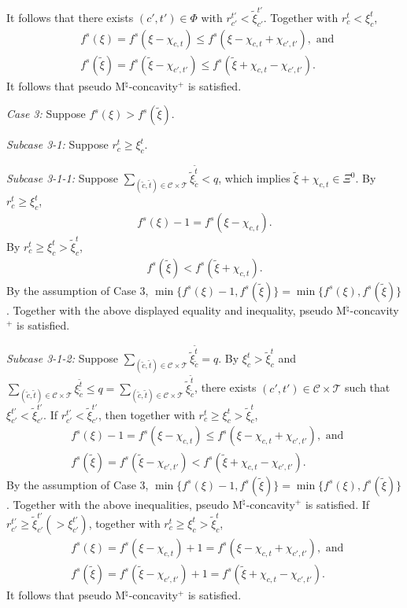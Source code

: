 \documentclass[12pt]{amsart}
\newcommand{\corigin}{c'}
\theoremstyle{remark}
\begin{document}
It follows that there exists $(\corigin,t')\in \Phi$ with $r_{\corigin}^{t'}<\tilde \xi_{\corigin}^{t'}$.
Together with $r_c^t<\xi_c^t$,
\begin{align*}
&f^s(\xi)=f^s(\xi-\chi_{c,t})\leq f^s(\xi-\chi_{c,t}+\chi_{\corigin,t'}), \text{ and } \\
&f^s(\tilde \xi)=f^s(\tilde \xi-\chi_{\corigin,t'})\leq f^s(\tilde \xi+\chi_{c,t}-\chi_{\corigin,t'}).
\end{align*}
It follows that pseudo M$^\natural$-concavity$^+$ is satisfied.

\smallskip
\noindent
\emph{Case 3:}
Suppose $f^s(\xi)>f^s(\tilde \xi)$.

\smallskip
\noindent
\emph{Subcase 3-1:}
Suppose $r_c^t\geq \xi_c^t$.

\smallskip
\noindent
\emph{Subcase 3-1-1:}
Suppose $\sum_{(\tilde c,\tilde t)\in \mathcal{C}\times \mathcal{T}}\tilde \xi_{\tilde c}^{\tilde t}<q$, which implies $\tilde \xi+\chi_{c,t}\in \Xi^0$.
By $r_c^t\geq \xi_c^t$,
\begin{align*}
f^s(\xi)-1=f^s(\xi-\chi_{c,t}).
\end{align*}
By $r_c^t\geq \xi_c^t>\tilde \xi_c^t$,
\begin{align*}
f^s(\tilde \xi)<f^s(\tilde \xi+\chi_{c,t}).
\end{align*}
By the assumption of Case 3, $\min\{f^s(\xi)-1, f^s(\tilde \xi)\}=\min\{f^s(\xi), f^s(\tilde \xi)\}$. Together with the above displayed equality and inequality, pseudo M$^\natural$-concavity$^+$ is satisfied.

\smallskip
\noindent
\emph{Subcase 3-1-2:}
Suppose $\sum_{(\tilde c,\tilde t)\in \mathcal{C}\times \mathcal{T}}\tilde \xi_{\tilde c}^{\tilde t}=q$. By $\xi_c^t>\tilde \xi_c^t$ and $\sum_{(\tilde c,\tilde t)\in \mathcal{C}\times \mathcal{T}}\xi_{\tilde c}^{\tilde t} \leq q=\sum_{(\tilde c, \tilde t)\in \mathcal{C}\times \mathcal{T}}\tilde \xi_{\tilde c}^{\tilde t}$, there exists $(\corigin,t')\in \mathcal{C}\times \mathcal{T}$ such that $\xi_{\corigin}^{t'}<\tilde \xi_{\corigin}^{t'}$. If
$r_{\corigin}^{t'}<\tilde \xi_{\corigin}^{t'}$, then together with $r_c^t\geq \xi_c^t>\tilde \xi_c^t$,
\begin{align*}
&f^s(\xi)-1=f^s(\xi-\chi_{c,t})\leq f^s(\xi-\chi_{c,t}+\chi_{\corigin,t'}), \text{ and } \\
&f^s(\tilde \xi)=f^s(\tilde \xi-\chi_{\corigin,t'})<f^s(\tilde \xi+\chi_{c,t}-\chi_{\corigin,t'}).
\end{align*}
By the assumption of Case 3, $\min\{f^s(\xi)-1, f^s(\tilde \xi)\}=\min\{f^s(\xi), f^s(\tilde \xi)\}$. Together with the above inequalities, pseudo M$^\natural$-concavity$^+$ is satisfied.
If $r_{\corigin}^{t'}\geq \tilde \xi_{\corigin}^{t'}(>\xi_{\corigin}^{t'})$, together with $r_c^t\geq \xi_c^t>\tilde \xi_c^t$,
\begin{align*}
&f^s(\xi)=f^s(\xi-\chi_{c,t})+1=f^s(\xi-\chi_{c,t}+\chi_{\corigin,t'}), \text{ and }\\
&f^s(\tilde \xi)=f^s(\tilde \xi-\chi_{\corigin,t'})+1=f^s(\tilde \xi+\chi_{c,t}-\chi_{\corigin,t'}).
\end{align*}
It follows that pseudo M$^\natural$-concavity$^+$ is satisfied.
\end{document}
